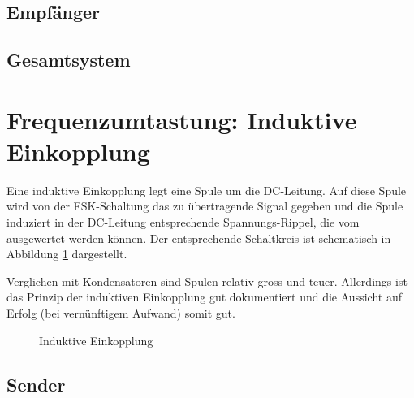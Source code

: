 \subsection{Empf\"anger}
\label{sec:simu:fsk:capacitive:receiver}

\subsection{Gesamtsystem}
\label{sec:simu:fsk:capacitive:system}

\section{Frequenzumtastung: Induktive Einkopplung}
\label{sec:simu:fsk:inductive}

Eine induktive Einkopplung legt eine  Spule um die DC-Leitung. Auf diese Spule
wird von der FSK-Schaltung das zu  \"ubertragende Signal gegeben und die Spule
induziert in  der DC-Leitung  entsprechende Spannungs-Rippel, die  vom \Master
ausgewertet werden k\"onnen. Der entsprechende  Schaltkreis ist schematisch in
Abbildung \ref{fig:circ:coupling:inductive} dargestellt.

Verglichen mit  Kondensatoren sind Spulen relativ  gross und teuer. Allerdings
ist das Prinzip  der induktiven Einkopplung gut dokumentiert  und die Aussicht
auf Erfolg (bei vern\"unftigem Aufwand) somit gut.

\begin{figure}[h!tb]
    \centering
    
    \caption{Induktive Einkopplung}
    \label{fig:circ:coupling:inductive}
\end{figure}

\subsection{Sender}
\label{sec:simu:fsk:inductive:transmitter}

